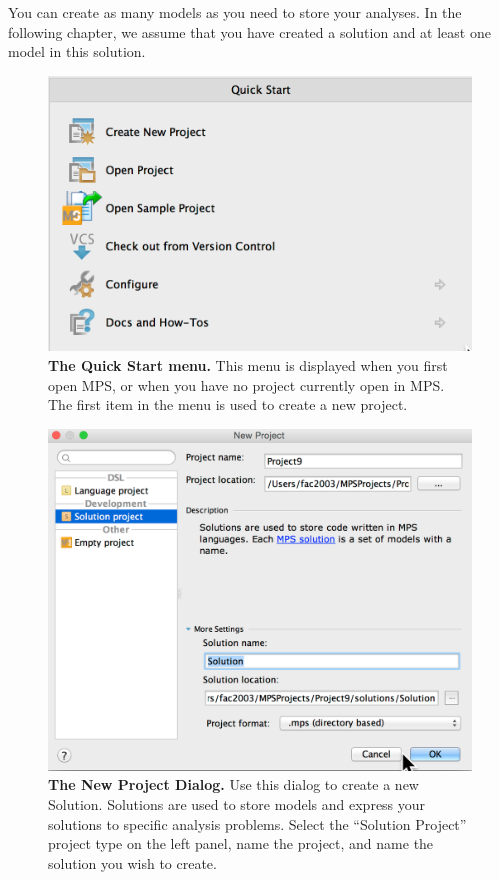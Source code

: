 You can create as many models as you need to store your analyses. In the following chapter, we assume that you have created a solution and at least one model in this solution. 


\begin{figure}
  \includegraphics[width=\figWidthNarrow]{figures/QuickStart.png}
  \caption[The Quick Start menu.]{\textbf{The Quick Start menu.} This menu is displayed when you first open MPS, or when you have no project currently open in MPS. The first item in the menu is used to create a new project. 
}\label{fig:QuickStartMenu}
\end{figure}

\begin{figure}
  \includegraphics[width=\figWidthNarrow]{figures/NewSolutionWizard.png}
  \caption[The New Project Dialog.]{\textbf{The New Project Dialog.} Use this dialog to create a new Solution. Solutions are used to store models and express your solutions to specific analysis problems. Select the ``Solution Project'' project type on the left panel, name the project, and name the solution you wish to create.
}\label{fig:NewProjectDialog}
\end{figure}
